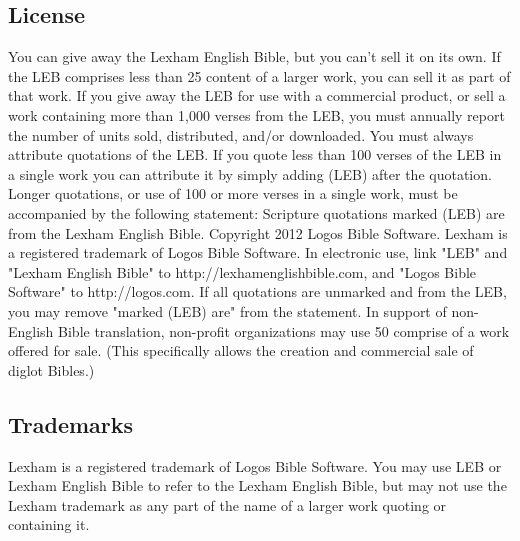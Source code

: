 \subsection*{License}
You can give away the Lexham English Bible, but you can't sell it on its own. If the LEB comprises less than 25%
content of a larger work, you can sell it as part of that work.
If you give away the LEB for use with a commercial product, or sell a work containing more than 1,000 verses from the LEB, 
you must annually report the number of units sold, distributed, and/or downloaded.
You must always attribute quotations of the LEB.
If you quote less than 100 verses of the LEB in a single work you can attribute it by simply adding (LEB) after the quotation. 
Longer quotations, or use of 100 or more verses in a single work, must be accompanied by the following statement:
Scripture quotations marked (LEB) are from the Lexham English Bible. Copyright 2012 Logos Bible Software. Lexham is a 
registered trademark of Logos Bible Software.
In electronic use, link "LEB" and "Lexham English Bible" to http://lexhamenglishbible.com, and "Logos Bible Software" 
to http://logos.com. If all quotations are unmarked and from the LEB, you may remove "marked (LEB) are" from the statement.
In support of non-English Bible translation, non-profit organizations may use 50%
comprise of a work offered for sale. (This specifically allows the creation and commercial sale of diglot Bibles.)


\subsection*{Trademarks}
Lexham is a registered trademark of Logos Bible Software. You may use LEB or Lexham English Bible to refer to the 
Lexham English Bible, but may not use the Lexham trademark as any part of the name of a larger work quoting or containing it.

\vfill
{}
\clearpage
\twocolumn
\justify









